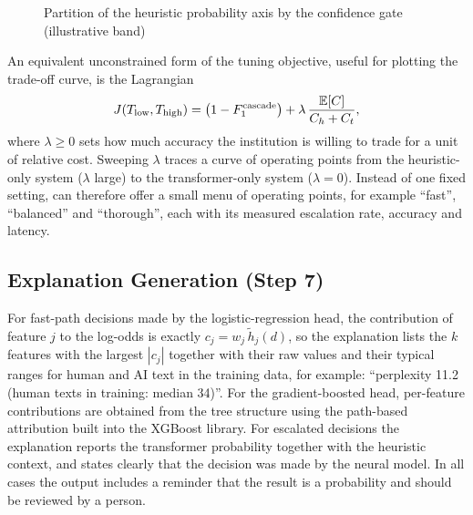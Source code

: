 \begin{figure}[H]
\centering
{}
\caption{Partition of the heuristic probability axis by the confidence gate (illustrative band)}
\label{fig:band}
\end{figure}

An equivalent unconstrained form of the tuning objective, useful for plotting
the trade-off curve, is the Lagrangian
\begin{equation}
  J(T_{\mathrm{low}},T_{\mathrm{high}}) = \big(1 - F_1^{\text{cascade}}\big) + \lambda\,\frac{\mathbb{E}[C]}{C_h + C_t},
  \label{eq:lagrangian}
\end{equation}
where $\lambda \ge 0$ sets how much accuracy the institution is willing to
trade for a unit of relative cost. Sweeping $\lambda$ traces a curve of
operating points from the heuristic-only system ($\lambda$ large) to the
transformer-only system ($\lambda = 0$). Instead of one fixed setting,
\veriscript{} can therefore offer a small menu of operating points, for
example ``fast'', ``balanced'' and ``thorough'', each with its measured
escalation rate, accuracy and latency.

\subsection{Explanation Generation (Step 7)}

For fast-path decisions made by the logistic-regression head, the contribution
of feature $j$ to the log-odds is exactly $c_j = w_j\,\tilde{h}_j(d)$, so the
explanation lists the $k$ features with the largest $|c_j|$ together with their
raw values and their typical ranges for human and AI text in the training
data, for example: ``perplexity 11.2 (human texts in training: median 34)''.
For the gradient-boosted head, per-feature contributions are obtained from the
tree structure using the path-based attribution built into the XGBoost
library. For escalated decisions the explanation reports the transformer
probability together with the heuristic context, and states clearly that the
decision was made by the neural model. In all cases the output includes a
reminder that the result is a probability and should be reviewed by a person.


